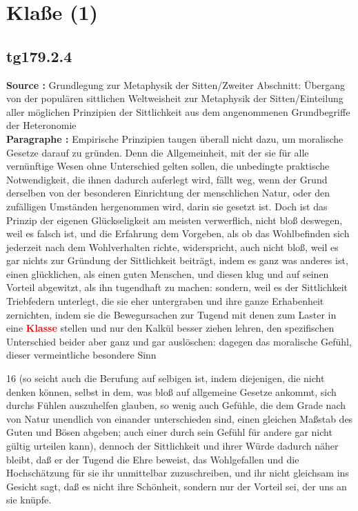 \documentclass[a4paper,12pt,twoside]{book}
\newcommand{\match}[1]{\textcolor{red}{\textbf{#1}}}
\newcommand{\unnumberedsection}[1]{
	\section*{#1}
	\addcontentsline{toc}{section}{#1}
	\markright{#1}
}
\begin{document}
	\unnumberedsection{Klaße (1)} 
	\subsection*{tg179.2.4} 
	\textbf{Source : }Grundlegung zur Metaphysik der Sitten/Zweiter Abschnitt: Übergang von der populären sittlichen Weltweisheit zur Metaphysik der Sitten/Einteilung aller möglichen Prinzipien der Sittlichkeit aus dem angenommenen Grundbegriffe der Heteronomie\\  
	
	\noindent\textbf{Paragraphe : }
	Empirische Prinzipien taugen überall nicht dazu, um moralische Gesetze darauf zu gründen. Denn die Allgemeinheit, mit der sie für alle vernünftige Wesen ohne Unterschied gelten sollen, die unbedingte praktische Notwendigkeit, die ihnen dadurch auferlegt wird, fällt weg, wenn der Grund derselben von der besonderen Einrichtung der menschlichen Natur, oder den zufälligen Umständen hergenommen wird, darin sie gesetzt ist. Doch  ist das Prinzip der eigenen Glückseligkeit am meisten verwerflich, nicht bloß deswegen, weil es falsch ist, und die Erfahrung dem Vorgeben, als ob das Wohlbefinden sich jederzeit nach dem Wohlverhalten richte, widerspricht, auch nicht bloß, weil es gar nichts zur Gründung der Sittlichkeit beiträgt, indem es ganz was anderes ist, einen glücklichen, als einen guten Menschen, und diesen klug und auf seinen Vorteil abgewitzt, als ihn tugendhaft zu machen: sondern, weil es der Sittlichkeit Triebfedern unterlegt, die sie eher untergraben und ihre ganze Erhabenheit zernichten, indem sie die Bewegursachen zur Tugend mit denen zum Laster in eine \match{Klasse} stellen und nur den Kalkül besser ziehen lehren, den spezifischen Unterschied beider aber ganz und gar auslöschen: dagegen das moralische Gefühl, dieser vermeintliche besondere Sinn
	
	
	16
	(so seicht auch die Berufung auf selbigen ist, indem diejenigen, die nicht denken können, selbst in dem, was bloß auf allgemeine Gesetze ankommt, sich durchs Fühlen auszuhelfen glauben, so wenig auch Gefühle, die dem Grade nach von Natur unendlich von einander unterschieden sind, einen gleichen Maßstab des Guten und Bösen abgeben; auch einer durch sein Gefühl für andere gar nicht gültig urteilen kann), dennoch der Sittlichkeit und ihrer Würde dadurch näher bleibt, daß er der Tugend die Ehre beweist, das Wohlgefallen und die Hochschätzung für sie ihr unmittelbar zuzuschreiben, und ihr nicht gleichsam ins Gesicht sagt, daß es nicht ihre Schönheit, sondern nur der Vorteil sei, der uns an sie knüpfe. 
	
\end{document}
